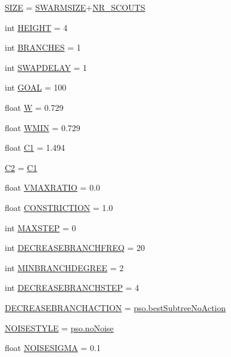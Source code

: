 \begin{CompactItemize}
\hyperlink{namespacepsostart_1fa98a85b621e24c1fe7ec83dcb072cf}{SIZE} = \hyperlink{namespacepsostart_ba1e88de83b58e8cdc0184dc3407c373}{SWARMSIZE}+\hyperlink{namespacepsostart_f25b4590bbc3756e6f18e18686ed8938}{NR\_\-SCOUTS}
\item 
int \hyperlink{namespacepsostart_3169f3551a7343c45c9e96aa8b60666d}{HEIGHT} = 4
\item 
int \hyperlink{namespacepsostart_11d3269a3043128b12801302bf4d8124}{BRANCHES} = 1
\item 
int \hyperlink{namespacepsostart_05cfdb315414f0d5976c3928efa64836}{SWAPDELAY} = 1
\item 
int \hyperlink{namespacepsostart_4baead81c8a51f0adb3699b010c3c02d}{GOAL} = 100
\item 
float \hyperlink{namespacepsostart_456afd2b02fe9acb6fab27940564b3e4}{W} = 0.729
\item 
float \hyperlink{namespacepsostart_82069834d25d8c4ee86ed668b81b7a1d}{WMIN} = 0.729
\item 
float \hyperlink{namespacepsostart_c56aa33bfc600b93a9cd5e53a40e5a74}{C1} = 1.494
\item 
\hyperlink{namespacepsostart_1987bb801c56c9308fe4aa22e828f42b}{C2} = \hyperlink{namespacepsostart_c56aa33bfc600b93a9cd5e53a40e5a74}{C1}
\item 
float \hyperlink{namespacepsostart_554ac1511096aa0bf399bb4bff5f267a}{VMAXRATIO} = 0.0
\item 
float \hyperlink{namespacepsostart_56788cb88647cd2b8eb88c38b81783ff}{CONSTRICTION} = 1.0
\item 
int \hyperlink{namespacepsostart_4eb0db99f944d03199e893e85f1a9e1d}{MAXSTEP} = 0
\item 
int \hyperlink{namespacepsostart_4f07a0ef99fa188d1a7858455c612f2c}{DECREASEBRANCHFREQ} = 20
\item 
int \hyperlink{namespacepsostart_68dd12c702b13dada8e2cf3f4d5bfd0e}{MINBRANCHDEGREE} = 2
\item 
int \hyperlink{namespacepsostart_b930a0309b8be9032c4a279ba8c8319a}{DECREASEBRANCHSTEP} = 4
\item 
\hyperlink{namespacepsostart_6322494f399c399aa59241046c0641cb}{DECREASEBRANCHACTION} = \hyperlink{namespacepso_2737e8486a12d9feb9ae65b954f424e3}{pso.bestSubtreeNoAction}
\item 
\hyperlink{namespacepsostart_814e0d868ce1bc57620a30199da53ca0}{NOISESTYLE} = \hyperlink{namespacepso_3ed42a0d68c0db8bc6613d3b4b1821ed}{pso.noNoise}
\item 
float \hyperlink{namespacepsostart_f9890e0280edab811a334354909f7c98}{NOISESIGMA} = 0.1

\end{CompactItemize}
